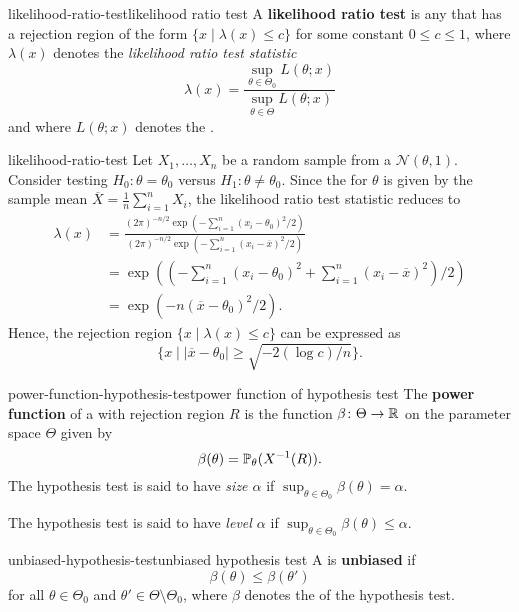 \begin{topic}{likelihood-ratio-test}{likelihood ratio test}
    A \textbf{likelihood ratio test} is any  that has a rejection region of the form $\{ x \mid \lambda(x) \le c \}$ for some constant $0 \le c \le 1$, where $\lambda(x)$ denotes the \textit{likelihood ratio test statistic}
    \[ \lambda(x) = \frac{\sup_{\theta \in \Theta_0} L(\theta; x)}{\sup_{\theta \in \Theta} L(\theta; x)} \]
    and where $L(\theta; x)$ denotes the .
\end{topic}

\begin{example}{likelihood-ratio-test}
    Let $X_1, \ldots, X_n$ be a random sample from a  $\mathcal{N}(\theta, 1)$. Consider testing $H_0 \colon \theta = \theta_0$ versus $H_1 \colon \theta \ne \theta_0$.
    Since the  for $\theta$ is given by the sample mean $\overline{X} = \frac{1}{n} \sum_{i = 1}^{n} X_i$, the likelihood ratio test statistic reduces to
    \[ \begin{aligned}
        \lambda(x) &= \frac{(2 \pi)^{-n/2} \exp \left( - \sum_{i = 1}^{n} (x_i - \theta_0)^2 / 2 \right)}{(2 \pi)^{-n/2} \exp \left( - \sum_{i = 1}^{n} (x_i - \overline{x})^2 / 2 \right)} \\
        &= \exp \left( \left( - \sum_{i = 1}^{n} (x_i - \theta_0)^2 + \sum_{i = 1}^{n} (x_i - \overline{x})^2 \right) / 2 \right) \\ 
        &= \exp \left( - n (\overline{x} - \theta_0)^2 / 2 \right) .
    \end{aligned} \]
    Hence, the rejection region $\{ x \mid \lambda(x) \le c \}$ can be expressed as
    \[ \{ x \mid |\overline{x} - \theta_0| \ge \sqrt{- 2 (\log c) / n} \} . \]
\end{example}

\begin{topic}{power-function-hypothesis-test}{power function of hypothesis test}
    The \textbf{power function} of a  with rejection region $R$ is the function $\beta \colon \Theta \to \mathbb{R}$ on the parameter space $\Theta$ given by
    \[ \beta(\theta) = \mathbb{P}_\theta(X^{-1}(R)) . \]
    The hypothesis test is said to have \textit{size $\alpha$} if $\sup_{\theta \in \Theta_0} \beta(\theta) = \alpha$.

    The hypothesis test is said to have \textit{level $\alpha$} if $\sup_{\theta \in \Theta_0} \beta(\theta) \le \alpha$.
\end{topic}

\begin{topic}{unbiased-hypothesis-test}{unbiased hypothesis test}
    A  is \textbf{unbiased} if
    \[ \beta(\theta) \le \beta(\theta') \]
    for all $\theta \in \Theta_0$ and $\theta' \in \Theta \setminus \Theta_0$, where $\beta$ denotes the  of the hypothesis test.
\end{topic}
